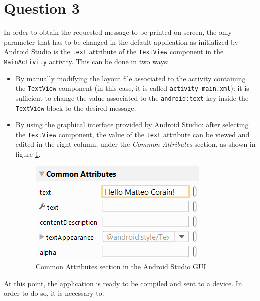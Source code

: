 \documentclass[letterpaper,headings=standardclasses]{scrartcl}
\begin{document}
\section{Question 3}

In order to obtain the requested message to be printed on screen, the only parameter that has to be changed in the default application as initialized by Android Studio is the \texttt{text} attribute of the \texttt{TextView} component in the \texttt{MainActivity} activity. This can be done in two ways:

\begin{itemize}

\item By manually modifying the layout file associated to the activity containing the \texttt{TextView} component (in this case, it is called \texttt{activity\_main.xml}): it is sufficient to change the value associated to the \texttt{android:text} key inside the \texttt{TextView} block to the desired message;

\item By using the graphical interface provided by Android Studio: after selecting the \texttt{TextView} component, the value of the \texttt{text} attribute can be viewed and edited in the right column, under the \emph{Common Attributes} section, as shown in figure \ref{common_attributes}.

\begin{figure}[H]
  \centering
  \includegraphics[width=.4\linewidth]{03_attributes.png}
  \caption{Common Attributes section in the Android Studio GUI}
  \label{common_attributes}
\end{figure}

\end{itemize}

At this point, the application is ready to be compiled and sent to a device. In order to do so, it is necessary to:
\end{document}
